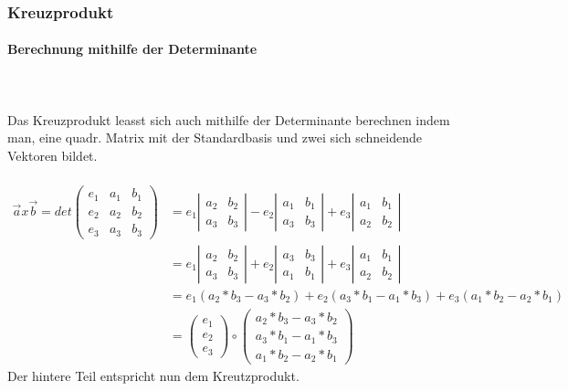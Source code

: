 \documentclass[a4paper]{article} %
\begin{document}
	\subsubsection{Kreuzprodukt}
	\paragraph{Berechnung mithilfe der Determinante}
	\hspace{0 cm} \\ \noindent \\
	Das Kreuzprodukt leasst sich auch mithilfe der Determinante berechnen indem man, eine quadr. Matrix mit der Standardbasis und zwei sich schneidende Vektoren
	bildet.\\\\
	$\begin{array}{cc}
	\vec{a} x \vec{b}=det\begin{pmatrix} e_1 & a_1 & b_1 \\ e_2 & a_2 & b_2  \\ e_3 & a_3 & b_3  \end{pmatrix} 
	&= e_1\left|\begin{array}{cc} a_2 & b_2 \\ a_3 & b_3\end{array} \right|-e_2\left|\begin{array}{cc} a_1 & b_1 \\ a_3 & b_3\end{array} \right|+e_3\left|\begin{array}{cc} a_1 & b_1 \\ a_2 & b_2\end{array} \right|\\
	&= e_1\left|\begin{array}{cc} a_2 & b_2 \\ a_3 & b_3\end{array} \right|+e_2\left|\begin{array}{cc} a_3 & b_3 \\ a_1 & b_1\end{array} \right|+e_3\left|\begin{array}{cc} a_1 & b_1 \\ a_2 & b_2\end{array} \right|\\
	&= e_1(a_2*b_3-a_3*b_2)+e_2(a_3*b_1-a_1*b_3)+e_3(a_1*b_2-a_2*b_1)\\
	&=\begin{pmatrix} e_1 \\ e_2 \\ e_3 \end{pmatrix} \circ \begin{pmatrix} a_2*b_3-a_3*b_2 \\ a_3*b_1-a_1*b_3 \\ a_1*b_2-a_2*b_1 \end{pmatrix} 
	\end{array}$
	\\Der hintere Teil entspricht nun dem Kreutzprodukt.
\end{document}

